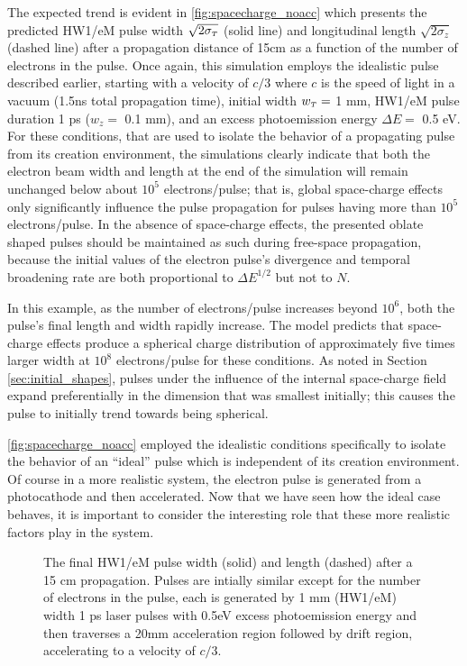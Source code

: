 The expected trend is evident in \ref{fig:spacecharge_noacc} which presents the predicted HW1/eM pulse width $\sqrt{2 \sigma_{\smallT}}$ (solid line) and longitudinal length $\sqrt{2 \sigma_{z}}$ (dashed line) after a propagation distance of 15cm as a function of the number of electrons in the pulse.
Once again, this simulation employs the idealistic pulse described earlier, starting with a velocity of $c/3$ where $c$ is the speed of light in a vacuum (1.5ns total propagation time), initial width $w_{\smallT} = $ 1 mm, HW1/eM pulse duration 1 ps ($w_{z} = $ 0.1 mm), and an excess photoemission energy $\Delta E = $ 0.5 eV.
For these conditions, that are used to isolate the behavior of a propagating pulse from its creation environment, the simulations clearly indicate that both the electron beam width and length at the end of the simulation will remain unchanged below about $10^5$ electrons/pulse; that is, global space-charge effects only significantly influence the pulse propagation for pulses having more than $10^5$ electrons/pulse.
In the absence of space-charge effects, the presented oblate shaped pulses should be maintained as such during free-space propagation, because the initial values of the electron pulse's divergence and temporal broadening rate are both proportional to $\Delta E^{1/2}$ but not to $N$.

In this example, as the number of electrons/pulse increases beyond $10^6$, both the pulse's final length and width rapidly increase.
The model predicts that space-charge effects produce a spherical charge distribution of approximately five times larger width at $10^8$ electrons/pulse for these conditions.
As noted in Section \ref{sec:initial_shapes}, pulses under the influence of the internal space-charge field expand preferentially in the dimension that was smallest initially; this causes the pulse to initially trend towards being spherical.

\ref{fig:spacecharge_noacc} employed the idealistic conditions specifically to isolate the behavior of an ``ideal'' pulse which is independent of its creation environment.
Of course in a more realistic system, the electron pulse is generated from a photocathode and then accelerated.
Now that we have seen how the ideal case behaves, it is important to consider the interesting role that these more realistic factors play in the system.

\begin{figure}
  \centering
  \begin{tikzpicture}
    
  \end{tikzpicture}
  \caption[More realistic free-space pulse evolution vs charge density]{
    The final HW1/eM pulse width (solid) and length (dashed) after a 15 cm propagation. 
    Pulses are intially similar except for the number of electrons in the pulse, each is generated by 1 mm (HW1/eM) width 1 ps laser pulses with 0.5eV excess photoemission energy and then traverses a 20mm acceleration region followed by drift region, accelerating to a velocity of $c/3$.
  }
  \label{fig:spacecharge_acc}
\end{figure}

